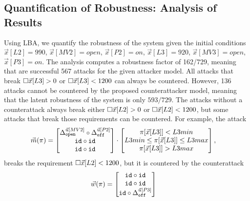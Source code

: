 {\subsection{Quantification of Robustness: Analysis of Results}
Using LBA, we quantify the robustness of the system given the initial conditions $\vec{x}[L2]=990$, $\vec{x}[MV2]=open$, $\vec{x}[P2]=on$, $\vec{x}[L3]=920$, $\vec{x}[MV3]=open$, $\vec{x}[P3]=on$. 
The analysis computes a robustness factor of 162/729, meaning that are successful 567 attacks for the given attacker model. All attacks that break ${{\square}}{\vec{x}[L3]>0}$ or ${{\square}}{\vec{x}[L3]<1200}$ can always be countered. However, 136 attacks cannot be countered by the proposed counterattacker model, meaning that the latent robustness of the system is only $593/729$. The attacks without a counterattack always break either ${{\square}}{\vec{x}[L2]>0}$ or ${{\square}}{\vec{x}[L2]<1200}$, but some attacks that break those requirements can be countered. For example, the attack
\begin{align*}
  \vec{m}(\pi)&=
  \begin{bmatrix}
   {\Delta}^{\vec{u}[MV2]}_{\texttt{open}}\circ {\Delta}^{\vec{u}[P2]}_{\texttt{off}} \\
   {\texttt{id}}\circ {\texttt{id}} \\
   {\texttt{id}}\circ {\texttt{id}} \\
  \end{bmatrix}
  \cdot
  \begin{bmatrix}
    \pi[\vec{x}[L3]]<L3min \\
    L3min \leq \pi[\vec{x}[L3]]\leq L3max \\
    \pi[\vec{x}[L3]]>L3max
  \end{bmatrix},
\end{align*} 
breaks the requirement ${{\square}}{\vec{x}[L2]<1200}$, but it is countered by the counterattack 
\begin{align*}
  \vec{w}(\pi)&=
  \begin{bmatrix}
    {\texttt{id}}\circ {\texttt{id}} \\
    {\texttt{id}}\circ {\texttt{id}} \\
    {\texttt{id}}\circ {\Delta}^{\vec{u}[P3]}_{\texttt{off}} \\

\end{bmatrix}
\end{align*}}

